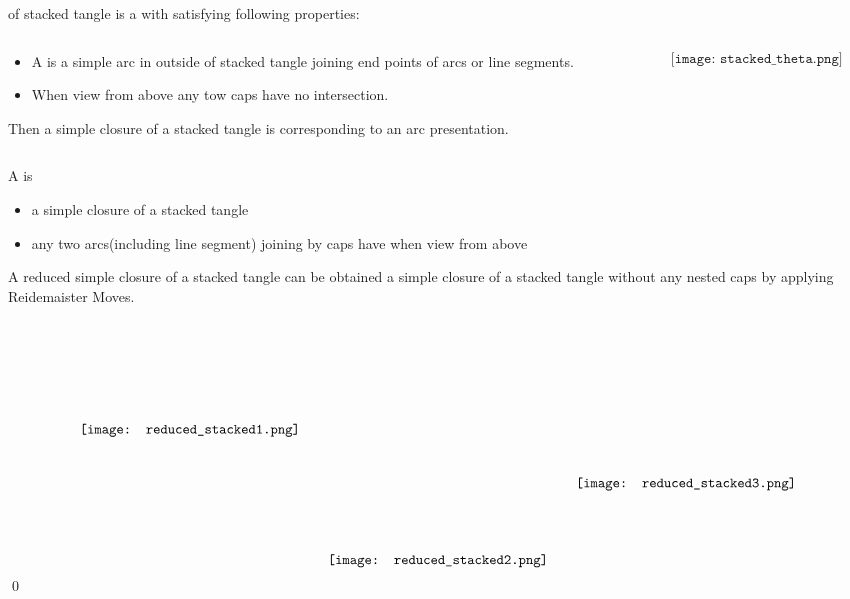 \begin{frame}
	 of stacked tangle is a  with  satisfying following properties:
	\vspace*{-10pt}
	\begin{columns}
		\begin{column}{.8\textwidth}
			\begin{itemize}
				\item A  is a simple arc in outside of stacked tangle joining end points of arcs or line segments.
				\item When view from above any tow caps have no intersection.
			\end{itemize}					
			Then a simple closure of a stacked tangle  is corresponding to an arc presentation.
		\end{column}

	\begin{column}{.2\textwidth}
		$$\texttt{[image: stacked\_theta.png]}$$
	\end{column}
	\end{columns}
	A  is 
	\begin{itemize}
		\item a simple closure of a stacked tangle 
		\item any two arcs(including line segment) joining by caps have  when view from above
	\end{itemize}
\end{frame}


\begin{frame}
	\begin{prop}
		A reduced simple closure of a stacked tangle
		can be obtained a simple closure of a stacked tangle without any nested caps by applying Reidemaister Moves.
	\end{prop}
	\mypf
	\vspace*{-12pt}
	$$\raisebox{-.13\textheight}{\texttt{[image: reduced\_stacked1.png]}}\qquad\raisebox{-.3\textheight}{\texttt{[image: reduced\_stacked2.png]}}\qquad\raisebox{-.2\textheight}{\texttt{[image: reduced\_stacked3.png]}}$$
	\hfill\qed
\end{frame}


